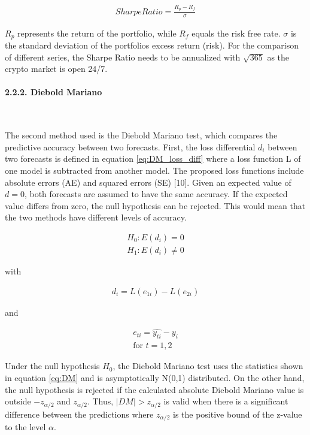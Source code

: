 \documentclass[
]{article}
\begin{document}
\begin{align} \label{eq:Sharpe}
  SharpeRatio = \frac{R_{p}-R_{f}}{\sigma}
\end{align}

\(R_{p}\) represents the return of the portfolio, while \(R_{f}\) equals
the risk free rate. \(\sigma\) is the standard deviation of the
portfolios excess return (risk). For the comparison of different series,
the Sharpe Ratio needs to be annualized with \(\sqrt{365}\) as the
crypto market is open 24/7.

\hypertarget{diebold_mariano}{%
\paragraph{2.2.2. Diebold Mariano}\label{diebold_mariano}}

~

The second method used is the Diebold Mariano test, which compares the
predictive accuracy between two forecasts. First, the loss differential
\(d_{i}\) between two forecasts is defined in equation
\ref{eq:DM_loss_diff} where a loss function L of one model is subtracted
from another model. The proposed loss functions include absolute errors
(AE) and squared errors (SE) {[}10{]}. Given an expected value of
\(d = 0\), both forecasts are assumed to have the same accuracy. If the
expected value differs from zero, the null hypothesis can be rejected.
This would mean that the two methods have different levels of accuracy.

\begin{align} \label{eq:DM_hypothesis}
  H_{0}: E(d_{i}) = 0 \\
  H_{1}: E(d_{i}) \neq 0 \nonumber
\end{align}

with

\begin{align} \label{eq:DM_loss_diff}
  d_{i} = L(e_{1i}) - L(e_{2i})
\end{align}

and

\begin{align} \label{eq:DM_error}
  e_{ti} = \hat{y_{ti}} - y_{i} \\
  \text{for } t={1,2} \nonumber
\end{align}

Under the null hypothesis \(H_{0}\), the Diebold Mariano test uses the
statistics shown in equation \ref{eq:DM} and is asymptotically N(0,1)
distributed. On the other hand, the null hypothesis is rejected if the
calculated absolute Diebold Mariano value is outside \(-z_{\alpha/2}\)
and \(z_{\alpha/2}\). Thus, \(|DM|>z_{\alpha/2}\) is valid when there is
a significant difference between the predictions where \(z_{\alpha/2}\)
is the positive bound of the z-value to the level \(\alpha\).
\end{document}
